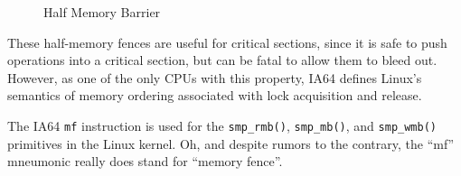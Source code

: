\begin{figure}[tb]
\begin{center}
\end{center}
\caption{Half Memory Barrier}
\end{figure}

These half-memory fences are useful for critical sections, since
it is safe to push operations into a critical section, but can be
fatal to allow them to bleed out.
However, as one of the only CPUs with this property, IA64 defines
Linux's semantics of memory ordering associated with lock acquisition
and release.

The IA64 {\tt mf} instruction is used for the {\tt smp\_rmb()},
{\tt smp\_mb()}, and {\tt smp\_wmb()} primitives in the Linux kernel.
Oh, and despite rumors to the contrary, the ``mf'' mneumonic really
does stand for ``memory fence''.

